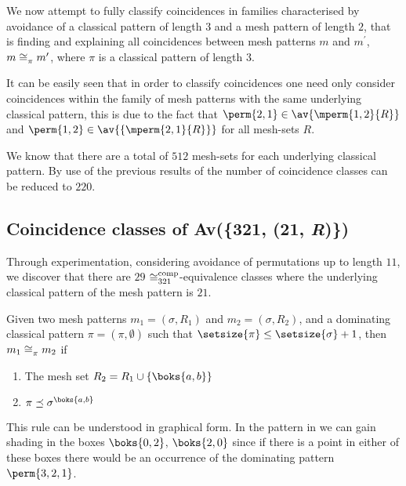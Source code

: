 We now attempt to fully classify coincidences in families characterised by
avoidance of a classical pattern of length \(3\) and a mesh pattern of length
\(2\), that is finding and explaining all coincidences between mesh patterns
\(m\) and \(m^\prime\), \(m\coinc{\pi} m^\prime\), where \(\pi\) is a classical
pattern of length \(3\).

It can be easily seen that in order to classify coincidences one need only
consider coincidences within the family of mesh patterns with the same
underlying classical pattern, this is due to the fact that
\(\perm{2,1}\in\av{\mperm{1,2}{R}}\) and
\(\perm{1,2}\in\av{\{\mperm{2,1}{R}\}}\) for all mesh-sets \(R\).

We know that there are a total of \(512\) mesh-sets for each underlying
classical pattern. By use of the previous results of
\textcite{DBLP:journals/corr/ClaessonTU14} the number of coincidence classes can
be reduced to \(220\).

\subsection{Coincidence classes of Av(\{321, (21, \textit{R})\})}
Through experimentation, considering avoidance of permutations up to length
\(11\), we discover that there are \(29\) \(\coinc[comp]{321}\)-equivalence
classes where the underlying classical pattern of the mesh pattern is \(21\).

\begin{proposition}
    \label{prop:dom1}
    Given two mesh patterns \(m_1 =(\sigma, R_1)\) and \(m_2 = (\sigma, R_2)\),
    and a dominating classical pattern \(\pi = (\pi,\emptyset)\) such that
    \(\setsize{\pi} \le \setsize{\sigma} + 1\), then \(m_1 \coinc{\pi} m_2 \)
    if
    \begin{enumerate}
        \item The mesh set \(R_2 = R_1 \cup \{\boks{a,b}\}\)
        \item \(\pi \preceq \sigma^\boks{a,b}\)\label{prop:dom1:cont}
    \end{enumerate}
\end{proposition}

This rule can be understood in graphical form. In the pattern in
 we can gain shading in the boxes \(\boks{0,2}\), \(\boks{2,0}\)
since if there is a point in either of these boxes there would be an occurrence of
the dominating pattern \(\perm{3,2,1}\).

